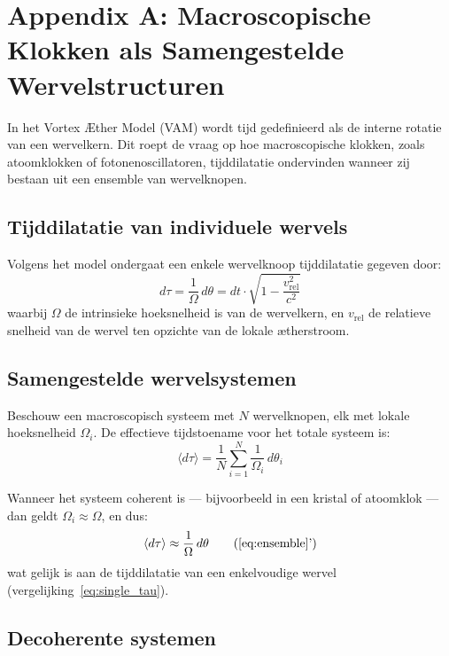 \section*{Appendix A: Macroscopische Klokken als Samengestelde Wervelstructuren}
\label{appendix:KlokkenInWervelstructuren}

In het Vortex Æther Model (VAM) wordt tijd gedefinieerd als de interne rotatie van een wervelkern. Dit roept de vraag op hoe macroscopische klokken, zoals atoomklokken of fotonenoscillatoren, tijddilatatie ondervinden wanneer zij bestaan uit een ensemble van wervelknopen.

\subsection*{Tijddilatatie van individuele wervels}

Volgens het model ondergaat een enkele wervelknoop tijddilatatie gegeven door:
\begin{equation}
    d\tau = \frac{1}{\Omega} \, d\theta = dt \cdot \sqrt{1 - \frac{v_\text{rel}^2}{c^2}} \label{eq:single_tau}
\end{equation}
waarbij \( \Omega \) de intrinsieke hoeksnelheid is van de wervelkern, en \( v_\text{rel} \) de relatieve snelheid van de wervel ten opzichte van de lokale ætherstroom.

\subsection*{Samengestelde wervelsystemen}

Beschouw een macroscopisch systeem met \( N \) wervelknopen, elk met lokale hoeksnelheid \( \Omega_i \). De effectieve tijdstoename voor het totale systeem is:
\begin{equation}
    \langle d\tau \rangle = \frac{1}{N} \sum_{i=1}^{N} \frac{1}{\Omega_i} \, d\theta_i \label{eq:ensemble}
\end{equation}

Wanneer het systeem coherent is — bijvoorbeeld in een kristal of atoomklok — dan geldt \( \Omega_i \approx \Omega \), en dus:
\begin{equation}
    \langle d\tau \rangle \approx \frac{1}{\Omega} \, d\theta \tag{\ref{eq:ensemble}'}
\end{equation}
wat gelijk is aan de tijddilatatie van een enkelvoudige wervel (vergelijking~\ref{eq:single_tau}).

\subsection*{Decoherente systemen}

